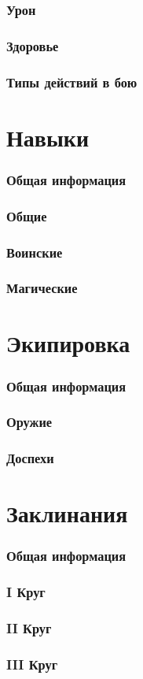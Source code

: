 \documentclass[10pt,twoside,twocolumn,openany]{book}
\begin{document}
\section{Урон}
\lipsum[1]
\section{Здоровье}
\lipsum[1]
\section{Типы действий в бою}
\lipsum[1]

\part{Навыки}
\section{Общая информация}
\lipsum[1]
\section{Общие}
\lipsum[1]
\section{Воинские}
\lipsum[1]
\section{Магические}
\lipsum[1]

\part{Экипировка}
\section{Общая информация}
\lipsum[1]
\section{Оружие}
\lipsum[1]
\section{Доспехи}
\lipsum[1]

\part{Заклинания}
\section{Общая информация}
\lipsum[1]
\section{\textrm{I} Круг}
\lipsum[1]
\section{\textrm{II} Круг}
\lipsum[1]
\section{\textrm{III} Круг}
\lipsum[1]
\end{document}

